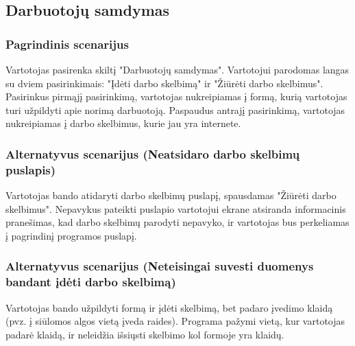 \documentclass[oneside]{VUMIFPSkursinis}
\begin{document}
\subsection{Darbuotojų samdymas}
	\subsubsection{Pagrindinis scenarijus}
	Vartotojas pasirenka skiltį "Darbuotojų samdymas". Vartotojui parodomas langas su dviem pasirinkimais: "Įdėti darbo skelbimą" ir "Žiūrėti darbo skelbimus". Pasirinkus pirmąjį pasirinkimą, vartotojas nukreipiamas į formą, kurią vartotojas turi užpildyti apie norimą darbuotoją. Paspaudus antrajį pasirinkimą, vartotojas nukreipiamas į darbo skelbimus, kurie jau yra internete.
\pagebreak
	\subsubsection{Alternatyvus scenarijus (Neatsidaro darbo skelbimų puslapis)}
	Vartotojas bando atidaryti darbo skelbimų puslapį, spausdamas "Žiūrėti darbo skelbimus". Nepavykus pateikti puslapio vartotojui ekrane atsiranda informacinis pranešimas, kad darbo skelbimų parodyti nepavyko, ir vartotojas bus perkeliamas į pagrindinį programos puslapį.
	\subsubsection{Alternatyvus scenarijus (Neteisingai suvesti duomenys bandant įdėti darbo skelbimą)}
	Vartotojas bando užpildyti formą ir įdėti skelbimą, bet padaro įvedimo klaidą (pvz. į siūlomos algos vietą įveda raides). Programa pažymi vietą, kur vartotojas padarė klaidą, ir neleidžia išsiųsti skelbimo kol formoje yra klaidų.
\end{document}
